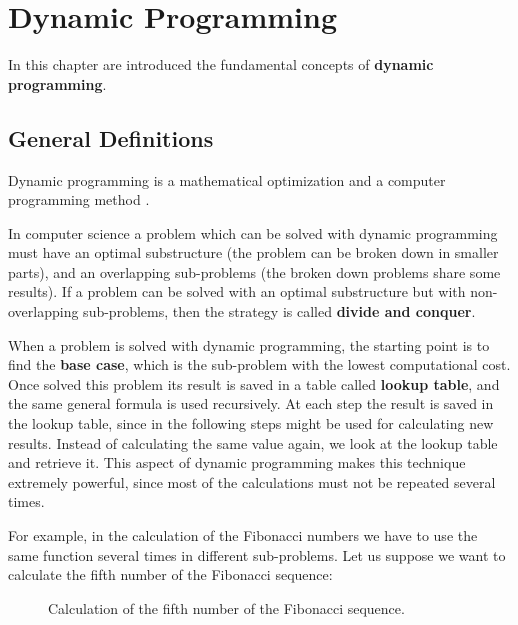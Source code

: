 \chapter{Dynamic Programming}
\label{chp:dynamicprogramming}
In this chapter are introduced the fundamental concepts of \textbf{dynamic programming}.
 
\section{General Definitions}
Dynamic programming is a mathematical optimization and a computer programming method \cite{wikidynamicprogramming}.

In computer science a problem which can be solved with dynamic programming must have an optimal substructure (the problem can be broken down in smaller parts), and an overlapping sub-problems (the broken down problems share some results). If a problem can be solved with an optimal substructure but with non-overlapping sub-problems, then the strategy is called \textbf{divide and conquer}.

When a problem is solved with dynamic programming, the starting point is to find the \textbf{base case}, which is the sub-problem with the lowest computational cost. Once solved this problem its result is saved in a table called \textbf{lookup table}, and the same general formula is used recursively. At each step the result is saved in the lookup table, since in the following steps might be used for calculating new results. Instead of calculating the same value again, we look at the lookup table and retrieve it. This aspect of dynamic programming makes this technique extremely powerful, since most of the calculations must not be repeated several times.

For example, in the calculation of the Fibonacci numbers we have to use the same function several times in different sub-problems. Let us suppose we want to calculate the fifth number of the Fibonacci sequence:

\begin{figure}[H]
\centering
{}
\caption[Calculation of the fifth number of the Fibonacci sequence.]{Calculation of the fifth number of the Fibonacci sequence.}
\end{figure}

